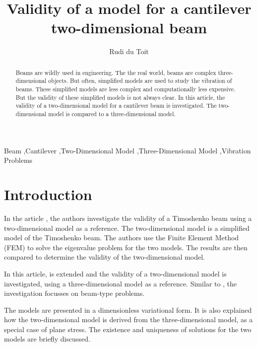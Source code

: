 



\begin{frontmatter}

\title{Validity of a model for a cantilever two-dimensional beam}

\author{Rudi du Toit}
\address{Department of Mathematics, University of Pretoria, Pretoria, South Africa}


\begin{abstract}
Beams are wildly used in engineering. The the real world, beams are complex three-dimensional objects. But often, simplified models are used to study the vibration of beams. These simplified models are less complex and computationally less expensive. But the validity of these simplified models is not always clear. In this article, the validity of a two-dimensional model for a cantilever beam is investigated. The two-dimensional model is compared to a three-dimensional model.
\end{abstract}

\begin{keyword}
	Beam \sep Cantilever \sep Two-Dimensional Model \sep Three-Dimensional Model \sep Vibration Problems
\end{keyword}


\end{frontmatter}

\section{Introduction}
In the article \cite{LVV09}, the authors investigate the validity of a Timoshenko beam using a two-dimensional model as a reference. The two-dimensional model is a simplified model of the Timoshenko beam. The authors use the Finite Element Method (FEM) to solve the eigenvalue problem for the two models. The results are then compared to determine the validity of the two-dimensional model.

In this article, \cite{LVV09} is extended and the validity of a two-dimensional model is investigated, using a three-dimensional model as a reference. Similar to \cite{LVV09}, the investigation focusses on beam-type problems.

The models are presented in a dimensionless variational form. It is also explained how the two-dimensional model is derived from the three-dimensional model, as a special case of plane stress. The existence and uniqueness of solutions for the two models are briefly discussed.

